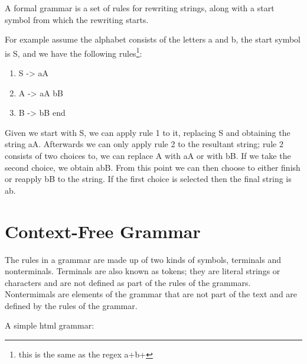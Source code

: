 \documentclass[
]{book}
\providecommand{\tightlist}{%
  \setlength{\itemsep}{0pt}\setlength{\parskip}{0pt}}
\begin{document}
A formal grammar is a set of rules for rewriting strings, along with a start symbol from which the rewriting starts.

For example assume the alphabet consists of the letters a and b, the start symbol is S, and we have the following rules\footnote{this is the same as the regex a+b+}:

\begin{enumerate}
\def\labelenumi{\arabic{enumi}.}
\tightlist
\item
  S -\textgreater{} aA
\item
  A -\textgreater{} aA \textbar{} bB
\item
  B -\textgreater{} bB \textbar{} end
\end{enumerate}

Given we start with S, we can apply rule 1 to it, replacing S and obtaining the string aA. Afterwards we can only apply rule 2 to the resultant string; rule 2 consists of two choices to, we can replace A with aA or with bB. If we take the second choice, we obtain abB. From this point we can then choose to either finish or reapply bB to the string. If the first choice is selected then the final string is ab.

\hypertarget{context-free-grammar}{%
\section{Context-Free Grammar}\label{context-free-grammar}}

The rules in a grammar are made up of two kinds of symbols, terminals and nonterminals. Terminals are also known as tokens; they are literal strings or characters and are not defined as part of the rules of the grammars. Nontermimals are elements of the grammar that are not part of the text and are defined by the rules of the grammar.

A simple html grammar:
\end{document}
